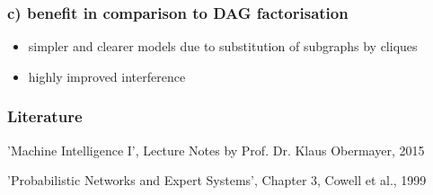 \documentclass[10 pt]{beamer}
\begin{document}
\begin{frame}
  \frametitle{c) benefit in comparison to DAG factorisation}

\begin{itemize}
\item simpler and clearer models due to substitution of subgraphs by cliques
\item highly improved interference
\end{itemize}


\end{frame}

\begin{frame}
\frametitle{Literature}
\footnotesize{
\begin{thebibliography}{99}

'Machine Intelligence I', Lecture Notes by Prof. Dr. Klaus Obermayer, 2015

'Probabilistic Networks and Expert Systems', Chapter 3, Cowell et al., 1999

\end{thebibliography}}
\end{frame}

\end{document}
